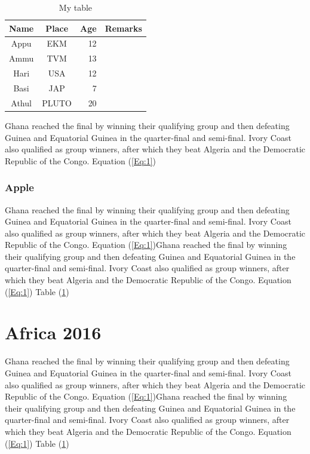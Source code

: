 \documentclass[11pt,a4]{report}
\begin{document}
\begin{table}[h]
	\begin{center}
		\begin{tabular}{|c|c|r|c|}
			\hline
			\rule[-1ex]{0pt}{2.5ex} Name & Place & Age & Remarks \\
			\hline
			\rule[-1ex]{0pt}{2.5ex} Appu & EKM & 12 &  \\
			\hline
			\rule[-1ex]{0pt}{2.5ex} Ammu & TVM & 13 &  \\
			\hline
			\rule[-1ex]{0pt}{2.5ex} Hari & USA &12  &  \\
			\hline
			\rule[-1ex]{0pt}{2.5ex} Basi & JAP  & 7 &  \\
			\hline
			\rule[-1ex]{0pt}{2.5ex} Athul & PLUTO & 20 &  \\
			\hline
		\end{tabular}
	\end{center}
\caption{My table}
\label{tab:1}
\end{table}


Ghana reached the final by winning their qualifying group and then defeating Guinea and Equatorial Guinea in the quarter-final and semi-final. Ivory Coast also qualified as group winners, after which they beat Algeria and the Democratic Republic of the Congo. Equation (\ref{Eq:1})
\subsection{Apple}
Ghana reached the final by winning their qualifying group and then defeating Guinea and Equatorial Guinea in the quarter-final and semi-final. Ivory Coast also qualified as group winners, after which they beat Algeria and the Democratic Republic of the Congo. Equation (\ref{Eq:1})Ghana reached the final by winning their qualifying group and then defeating Guinea and Equatorial Guinea in the quarter-final and semi-final. Ivory Coast also qualified as group winners, after which they beat Algeria and the Democratic Republic of the Congo. Equation (\ref{Eq:1}) Table (\ref{tab:1})


\chapter{Africa 2016}
Ghana reached the final by winning their qualifying group and then defeating Guinea and Equatorial Guinea in the quarter-final and semi-final. Ivory Coast also qualified as group winners, after which they beat Algeria and the Democratic Republic of the Congo. Equation (\ref{Eq:1})Ghana reached the final by winning their qualifying group and then defeating Guinea and Equatorial Guinea in the quarter-final and semi-final. Ivory Coast also qualified as group winners, after which they beat Algeria and the Democratic Republic of the Congo. Equation (\ref{Eq:1}) Table (\ref{tab:1})
\end{document}
